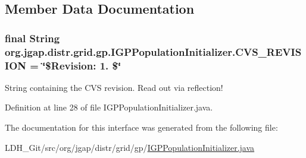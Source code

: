 \subsection{Member Data Documentation}
\hypertarget{interfaceorg_1_1jgap_1_1distr_1_1grid_1_1gp_1_1_i_g_p_population_initializer_a52180e15b7b8301092d7f8cb4f394ca1}{
\subsubsection[{C\-V\-S\-\_\-\-R\-E\-V\-I\-S\-I\-O\-N}]{\setlength{\rightskip}{0pt plus 5cm}final String org.\-jgap.\-distr.\-grid.\-gp.\-I\-G\-P\-Population\-Initializer.\-C\-V\-S\-\_\-\-R\-E\-V\-I\-S\-I\-O\-N = \char`\"{}\$Revision\-: 1. \$\char`\"{}\hspace{0.3cm}{\ttfamily [static]}}}\label{interfaceorg_1_1jgap_1_1distr_1_1grid_1_1gp_1_1_i_g_p_population_initializer_a52180e15b7b8301092d7f8cb4f394ca1}
String containing the C\-V\-S revision. Read out via reflection! 

Definition at line 28 of file I\-G\-P\-Population\-Initializer.\-java.



The documentation for this interface was generated from the following file\-:\begin{DoxyCompactItemize}
\item 
L\-D\-H\-\_\-\-Git/src/org/jgap/distr/grid/gp/\hyperlink{_i_g_p_population_initializer_8java}{I\-G\-P\-Population\-Initializer.\-java}\end{DoxyCompactItemize}
